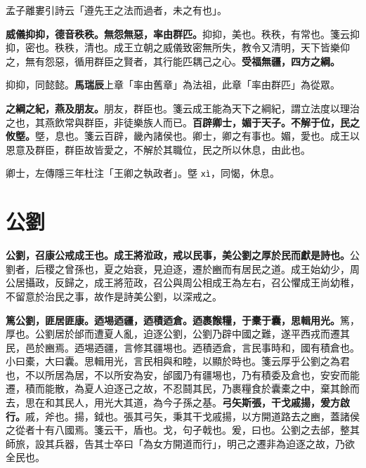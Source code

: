 \begin{quoting}孟子離婁引詩云「遵先王之法而過者，未之有也」。\end{quoting}

\textbf{威儀抑抑，德音秩秩。無怨無惡，率由群匹。}{\footnotesize 抑抑，美也。秩秩，有常也。箋云抑抑，密也。秩秩，清也。成王立朝之威儀致密無所失，教令又清明，天下皆樂仰之，無有怨惡，循用群臣之賢者，其行能匹耦己之心。}\textbf{受福無疆，四方之綱。}

\begin{quoting}抑抑，同懿懿。\textbf{馬瑞辰}上章「率由舊章」為法祖，此章「率由群匹」為從眾。\end{quoting}

\textbf{之綱之紀，燕及朋友。}{\footnotesize 朋友，群臣也。箋云成王能為天下之綱紀，謂立法度以理治之也，其燕飲常與群臣，非徒樂族人而已。}\textbf{百辟卿士，媚于天子。不解于位，民之攸墍。}{\footnotesize 墍，息也。箋云百辟，畿內諸侯也。卿士，卿之有事也。媚，愛也。成王以恩意及群臣，群臣故皆愛之，不解於其職位，民之所以休息，由此也。}

\begin{quoting}卿士，左傳隱三年杜注「王卿之執政者」。墍 \texttt{xì}，同愒，休息。\end{quoting}

\section{公劉}


\textbf{公劉，召康公戒成王也。成王將涖政，戒以民事，美公劉之厚於民而獻是詩也。}{\footnotesize 公劉者，后稷之曾孫也，夏之始衰，見迫逐，遷於豳而有居民之道。成王始幼少，周公居攝政，反歸之，成王將蒞政，召公與周公相成王為左右，召公懼成王尚幼稚，不留意於治民之事，故作是詩美公劉，以深戒之。}

\textbf{篤公劉，匪居匪康。迺埸迺疆，迺積迺倉。迺裹餱糧，于橐于囊，思輯用光。}{\footnotesize 篤，厚也。公劉居於邰而遭夏人亂，迫逐公劉，公劉乃辟中國之難，遂平西戎而遷其民，邑於豳焉。迺埸迺疆，言修其疆埸也。迺積迺倉，言民事時和，國有積倉也。小曰橐，大曰囊。思輯用光，言民相與和睦，以顯於時也。箋云厚乎公劉之為君也，不以所居為居，不以所安為安，邰國乃有疆埸也，乃有積委及倉也，安安而能遷，積而能散，為夏人迫逐己之故，不忍鬪其民，乃裹糧食於囊橐之中，棄其餘而去，思在和其民人，用光大其道，為今子孫之基。}\textbf{弓矢斯張，干戈戚揚，爰方啟行。}{\footnotesize 戚，斧也。揚，鉞也。張其弓矢，秉其干戈戚揚，以方開道路去之豳，蓋諸侯之從者十有八國焉。箋云干，盾也。戈，句孑戟也。爰，曰也。公劉之去邰，整其師旅，設其兵器，告其士卒曰「為女方開道而行」，明己之遷非為迫逐之故，乃欲全民也。}

